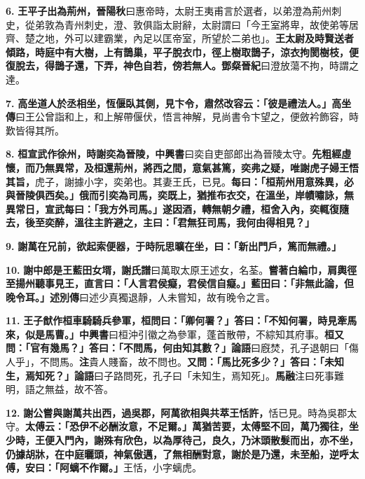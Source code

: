 \textbf{6.} \textbf{王平子出為荊州，}{\footnotesize \textbf{晉陽秋}曰惠帝時，太尉王夷甫言於選者，以弟澄為荊州刺史，從弟敦為青州刺史，澄、敦俱詣太尉辭，太尉謂曰「今王室將卑，故使弟等居齊、楚之地，外可以建霸業，內足以匡帝室，所望於二弟也」。}\textbf{王太尉及時賢送者傾路，時庭中有大樹，上有鵲巢，平子脫衣巾，徑上樹取鵲子，涼衣拘閡樹枝，便復脫去，得鵲子還，下弄，神色自若，傍若無人。}{\footnotesize \textbf{鄧粲晉紀}曰澄放蕩不拘，時謂之達。}

\textbf{7.} \textbf{高坐道人於丞相坐，恆偃臥其側，見卞令，肅然改容云：「彼是禮法人。」}{\footnotesize \textbf{高坐傳}曰王公曾詣和上，和上解帶偃伏，悟言神解，見尚書令卞望之，便斂衿飾容，時歎皆得其所。}

\textbf{8.} \textbf{桓宣武作徐州，時謝奕為晉陵，}{\footnotesize \textbf{中興書}曰奕自吏部郎出為晉陵太守。}\textbf{先粗經虛懷，而乃無異常，及桓還荊州，將西之間，意氣甚篤，奕弗之疑，唯謝虎子婦王悟其旨，}{\footnotesize 虎子，謝據小字，奕弟也。其妻王氏，已見。}\textbf{每曰：「桓荊州用意殊異，必與晉陵俱西矣。」俄而引奕為司馬，奕既上，猶推布衣交，在溫坐，岸幘嘯詠，無異常日，宣武每曰：「我方外司馬。」遂因酒，轉無朝夕禮，桓舍入內，奕輒復隨去，後至奕醉，溫往主許避之，主曰：「君無狂司馬，我何由得相見？」}

\textbf{9.} \textbf{謝萬在兄前，欲起索便器，于時阮思曠在坐，曰：「新出門戶，篤而無禮。」}

\textbf{10.} \textbf{謝中郎是王藍田女壻，}{\footnotesize \textbf{謝氏譜}曰萬取太原王述女，名荃。}\textbf{嘗著白綸巾，肩輿徑至揚州聽事見王，直言曰：「人言君侯癡，君侯信自癡。」藍田曰：「非無此論，但晚令耳。」}{\footnotesize \textbf{述別傳}曰述少真獨退靜，人未嘗知，故有晚令之言。}

\textbf{11.} \textbf{王子猷作桓車騎騎兵參軍，桓問曰：「卿何署？」答曰：「不知何署，時見牽馬來，似是馬曹。」}{\footnotesize \textbf{中興書}曰桓沖引徽之為參軍，蓬首散帶，不綜知其府事。}\textbf{桓又問：「官有幾馬？」答曰：「不問馬，何由知其數？」}{\footnotesize \textbf{論語}曰廐焚，孔子退朝曰「傷人乎」，不問馬。\textbf{注}貴人賤畜，故不問也。}\textbf{又問：「馬比死多少？」答曰：「未知生，焉知死？」}{\footnotesize \textbf{論語}曰子路問死，孔子曰「未知生，焉知死」。\textbf{馬融}注曰死事難明，語之無益，故不答。}

\textbf{12.} \textbf{謝公嘗與謝萬共出西，過吳郡，阿萬欲相與共萃王恬許，}{\footnotesize 恬已見。時為吳郡太守。}\textbf{太傅云：「恐伊不必酬汝意，不足爾。」萬猶苦要，太傅堅不回，萬乃獨往，坐少時，王便入門內，謝殊有欣色，以為厚待己，良久，乃沐頭散髮而出，亦不坐，仍據胡牀，在中庭曬頭，神氣傲邁，了無相酬對意，謝於是乃還，未至船，逆呼太傅，安曰：「阿螭不作爾。」}{\footnotesize 王恬，小字螭虎。}

